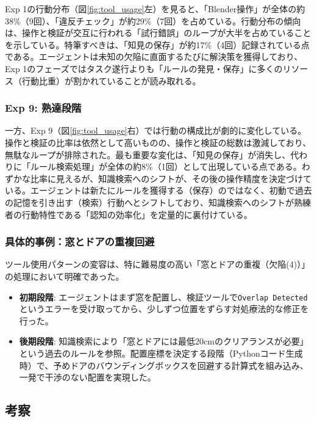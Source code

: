 \documentclass[dvipdfmx, a4paper, 9pt]{deimj}
\begin{document}
Exp 1の行動分布（図\ref{fig:tool_usage}左）を見ると、「Blender操作」が全体の約38\%（9回）、「違反チェック」が約29\%（7回）を占めている。行動分布の傾向は、操作と検証が交互に行われる「試行錯誤」のループが大半を占めていることを示している。特筆すべきは、「知見の保存」が約17\%（4回）記録されている点である。エージェントは未知の欠陥に直面するたびに解決策を獲得しており、Exp 1のフェーズではタスク遂行よりも「ルールの発見・保存」に多くのリソース（行動比重）が割かれていることが読み取れる。

\subsubsection{Exp 9: 熟達段階}

一方、Exp 9（図\ref{fig:tool_usage}右）では行動の構成比が劇的に変化している。操作と検証の比率は依然として高いものの、操作と検証の総数は激減しており、無駄なループが排除された。最も重要な変化は、「知見の保存」が消失し、代わりに「ルール検索処理」が全体の約8\%（1回）として出現している点である。わずかな比率に見えるが、知識検索へのシフトが、その後の操作精度を決定づけている。エージェントは新たにルールを獲得する（保存）のではなく、初動で過去の記憶を引き出す（検索）行動へとシフトしており、知識検索へのシフトが熟練者の行動特性である「認知の効率化」を定量的に裏付けている。

\subsubsection{具体的事例：窓とドアの重複回避}

ツール使用パターンの変容は、特に難易度の高い「窓とドアの重複（欠陥(4)）」の処理において明確であった。

\begin{itemize}
  \item \textbf{初期段階}: エージェントはまず窓を配置し、検証ツールで\texttt{Overlap Detected}というエラーを受け取ってから、少しずつ位置をずらす対処療法的な修正を行った。
  \item \textbf{後期段階}: 知識検索により「窓とドアには最低20cmのクリアランスが必要」という過去のルールを参照。配置座標を決定する段階（Pythonコード生成時）で、予めドアのバウンディングボックスを回避する計算式を組み込み、一発で干渉のない配置を実現した。
\end{itemize}

\subsection{考察}
\end{document}
